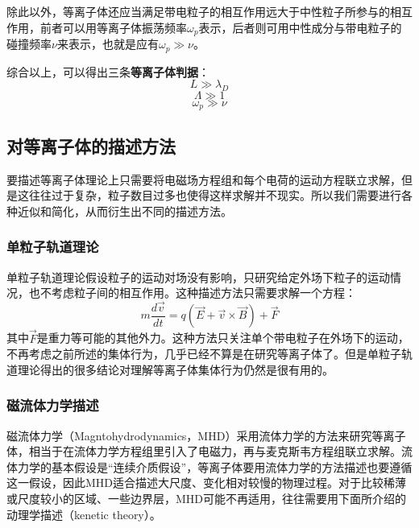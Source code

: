 		除此以外，等离子体还应当满足带电粒子的相互作用远大于中性粒子所参与的相互作用，前者可以用等离子体振荡频率$\omega_p$表示，后者则可用中性成分与带电粒子的碰撞频率$\nu$来表示，也就是应有$\omega_p\gg\nu$。
		
		综合以上，可以得出三条\textbf{等离子体判据}：
		\begin{equation}\label{key}
		L\gg \lambda_D
		\end{equation}
		\begin{equation}\label{key}
		\varLambda\gg1
		\end{equation}
		\begin{equation}\label{key}
		\omega_p\gg\nu
		\end{equation}
		
		\subsection{对等离子体的描述方法}
		\hspace{2em}要描述等离子体理论上只需要将电磁场方程组和每个电荷的运动方程联立求解，但是这往往过于复杂，粒子数目过多也使得这样求解并不现实。所以我们需要进行各种近似和简化，从而衍生出不同的描述方法。
			\subsubsection{单粒子轨道理论}
			\hspace{2em}单粒子轨道理论假设粒子的运动对场没有影响，只研究给定外场下粒子的运动情况，也不考虑粒子间的相互作用。这种描述方法只需要求解一个方程：
			\begin{equation}\label{key}
			m\frac{d\vec{v}}{dt}=q(\vec{E}+\vec{v}\times\vec{B})+\vec{F}
			\end{equation}
			其中$\vec{F}$是重力等可能的其他外力。这种方法只关注单个带电粒子在外场下的运动，不再考虑之前所述的集体行为，几乎已经不算是在研究等离子体了。但是单粒子轨道理论得出的很多结论对理解等离子体集体行为仍然是很有用的。
			
			\subsubsection{磁流体力学描述}
			\hspace{2em}磁流体力学（Magntohydrodynamics，MHD）采用流体力学的方法来研究等离子体，相当于在流体力学方程组里引入了电磁力，再与麦克斯韦方程组联立求解。流体力学的基本假设是“连续介质假设”，等离子体要用流体力学的方法描述也要遵循这一假设，因此MHD适合描述大尺度、变化相对较慢的物理过程。对于比较稀薄或尺度较小的区域、一些边界层，MHD可能不再适用，往往需要用下面所介绍的动理学描述（kenetic theory）。
			
